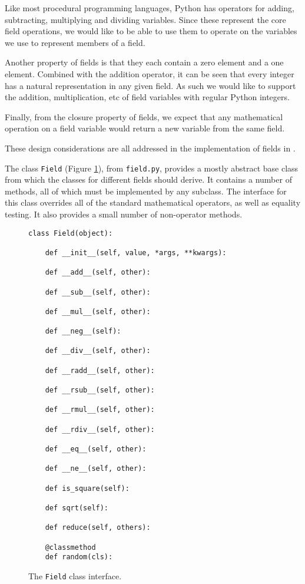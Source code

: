 Like most procedural programming languages, Python has operators for adding, subtracting, multiplying and dividing variables.
Since these represent the core field operations, we would like to be able to use them to operate on the variables we use to represent members of a field.

Another property of fields is that they each contain a zero element and a one element.
Combined with the addition operator, it can be seen that every integer has a natural representation in any given field.
As such we would like to support the addition, multiplication, etc of field variables with regular Python integers.

Finally, from the closure property of fields, we expect that any mathematical operation on a field variable would return a new variable from the same field.

These design considerations are all addressed in the implementation of fields in \pygeom\!.

The class \texttt{Field} (Figure \ref{fig:field}), from \texttt{field.py}, provides a mostly abstract base class from which the classes for different fields should derive.
It contains a number of methods, all of which must be implemented by any subclass.
The interface for this class overrides all of the standard mathematical operators, as well as equality testing.
It also provides a small number of non-operator methods.

\begin{figure}[!hbt]
\begin{verbatim}
class Field(object):

    def __init__(self, value, *args, **kwargs):

    def __add__(self, other):

    def __sub__(self, other):

    def __mul__(self, other):

    def __neg__(self):

    def __div__(self, other):

    def __radd__(self, other):

    def __rsub__(self, other):

    def __rmul__(self, other):

    def __rdiv__(self, other):

    def __eq__(self, other):

    def __ne__(self, other):

    def is_square(self):

    def sqrt(self):

    def reduce(self, others):

    @classmethod
    def random(cls):
\end{verbatim}
\caption{The \texttt{Field} class interface.}\label{fig:field}
\end{figure}


